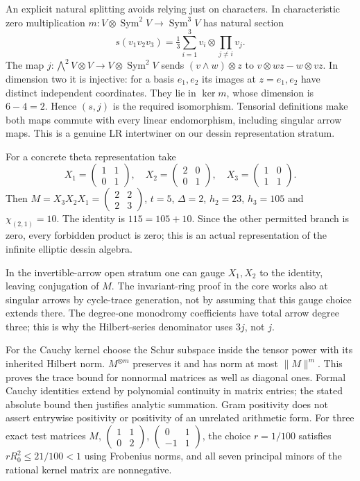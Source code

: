 \documentclass[11pt]{article}
\theoremstyle{definition}\newtheorem{definition}[theorem]{Definition}
\theoremstyle{remark}\newtheorem{remark}[theorem]{Remark}
\begin{document}
An explicit natural splitting avoids relying just on characters. In characteristic zero multiplication $m:V\otimes\operatorname{Sym}^2V\to\operatorname{Sym}^3V$ has natural section
\[
 s(v_1v_2v_3)=\tfrac13\sum_{i=1}^3v_i\otimes\prod_{j\ne i}v_j.
\]
The map $j:\bigwedge^2V\otimes V\to V\otimes\operatorname{Sym}^2V$ sends $(v\wedge w)\otimes z$ to $v\otimes wz-w\otimes vz$. In dimension two it is injective: for a basis $e_1,e_2$ its images at $z=e_1,e_2$ have distinct independent coordinates. They lie in $\ker m$, whose dimension is $6-4=2$. Hence $(s,j)$ is the required isomorphism. Tensorial definitions make both maps commute with every linear endomorphism, including singular arrow maps. This is a genuine LR intertwiner on our dessin representation stratum.

For a concrete theta representation take
\[
 X_1=\begin{pmatrix}1&1\\0&1\end{pmatrix},\quad
 X_2=\begin{pmatrix}2&0\\0&1\end{pmatrix},\quad
 X_3=\begin{pmatrix}1&0\\1&1\end{pmatrix}.
\]
Then $M=X_3X_2X_1=\left(\begin{smallmatrix}2&2\\2&3\end{smallmatrix}\right)$, $t=5$, $\Delta=2$, $h_2=23$, $h_3=105$ and $\chi_{(2,1)}=10$. The identity is $115=105+10$. Since the other permitted branch is zero, every forbidden product is zero; this is an actual representation of the infinite elliptic dessin algebra.

In the invertible-arrow open stratum one can gauge $X_1,X_2$ to the identity, leaving conjugation of $M$. The invariant-ring proof in the core works also at singular arrows by cycle-trace generation, not by assuming that this gauge choice extends there. The degree-one monodromy coefficients have total arrow degree three; this is why the Hilbert-series denominator uses $3j$, not $j$.

For the Cauchy kernel choose the Schur subspace inside the tensor power with its inherited Hilbert norm. $M^{\otimes m}$ preserves it and has norm at most $\|M\|^m$. This proves the trace bound for nonnormal matrices as well as diagonal ones. Formal Cauchy identities extend by polynomial continuity in matrix entries; the stated absolute bound then justifies analytic summation. Gram positivity does not assert entrywise positivity or positivity of an unrelated arithmetic form. For three exact test matrices $M$, $\left(\begin{smallmatrix}1&1\\0&2\end{smallmatrix}\right)$, $\left(\begin{smallmatrix}0&1\\-1&1\end{smallmatrix}\right)$, the choice $r=1/100$ satisfies $rR_0^2\le21/100<1$ using Frobenius norms, and all seven principal minors of the rational kernel matrix are nonnegative.
\end{document}

